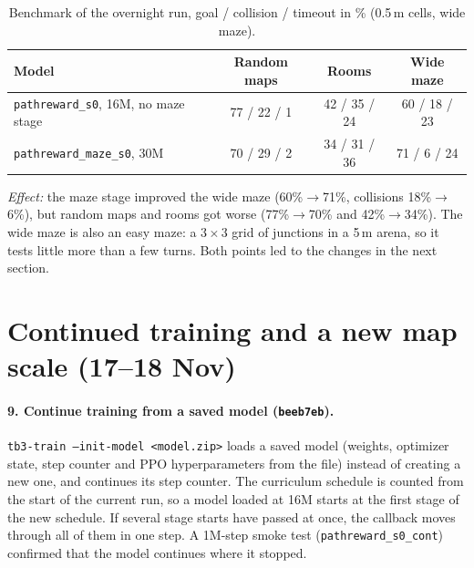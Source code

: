 \documentclass[11pt,a4paper]{article}
\newcommand{\code}[1]{\texttt{#1}}
\begin{document}
\begin{table}[H]
      \centering\small
      \begin{tabular}{@{}l c c c@{}}
            \toprule
            Model                                      & Random maps   & Rooms         & Wide maze     \\
            \midrule
            \code{pathreward\_s0}, 16M, no maze stage  & 77 / 22 / 1   & 42 / 35 / 24  & 60 / 18 / 23  \\
            \code{pathreward\_maze\_s0}, 30M           & 70 / 29 / 2   & 34 / 31 / 36  & 71 / 6 / 24   \\
            \bottomrule
      \end{tabular}
      \caption{Benchmark of the overnight run, goal / collision / timeout in \%
            (0.5\,m cells, wide maze).}
      \label{tab:widemaze}
\end{table}

\emph{Effect:} the maze stage improved the wide maze (60\%$\to$71\%, collisions
18\%$\to$6\%), but random maps and rooms got worse (77\%$\to$70\% and
42\%$\to$34\%). The wide maze is also an easy maze: a $3\times3$ grid of
junctions in a 5\,m arena, so it tests little more than a few turns. Both
points led to the changes in the next section.

\section{Continued training and a new map scale (17--18 Nov)}
\label{sec:world2}

\paragraph{9. Continue training from a saved model (\code{beeb7eb}).}
\code{tb3-train --init-model <model.zip>} loads a saved model (weights,
optimizer state, step counter and PPO hyperparameters from the file) instead
of creating a new one, and continues its step counter. The curriculum
schedule is counted from the start of the current run, so a model loaded at
16M starts at the first stage of the new schedule. If several stage starts
have passed at once, the callback moves through all of them in one step.
A 1M-step smoke test (\code{pathreward\_s0\_cont}) confirmed that the model
continues where it stopped.
\end{document}

